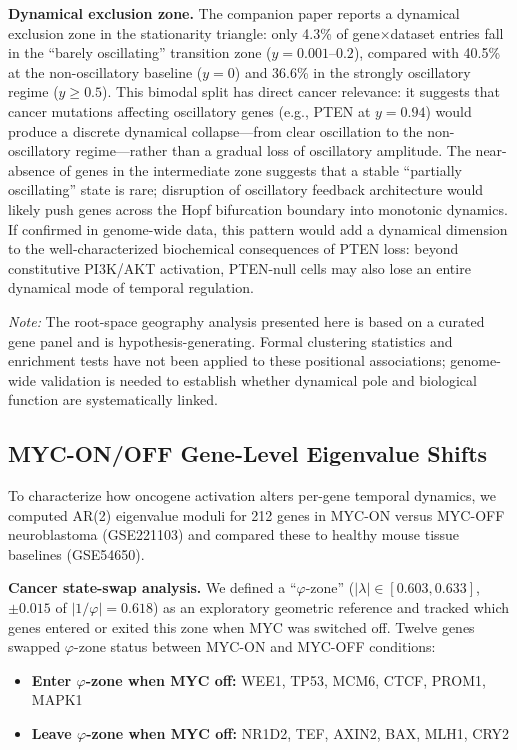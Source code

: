 \documentclass[11pt,letterpaper]{article}
\begin{document}
\textbf{Dynamical exclusion zone.} The companion paper \citep{whiteside2026paper1} reports a dynamical exclusion zone in the stationarity triangle: only 4.3\% of gene$\times$dataset entries fall in the ``barely oscillating'' transition zone ($y = 0.001$--$0.2$), compared with 40.5\% at the non-oscillatory baseline ($y = 0$) and 36.6\% in the strongly oscillatory regime ($y \geq 0.5$). This bimodal split has direct cancer relevance: it suggests that cancer mutations affecting oscillatory genes (e.g., PTEN at $y = 0.94$) would produce a discrete dynamical collapse---from clear oscillation to the non-oscillatory regime---rather than a gradual loss of oscillatory amplitude. The near-absence of genes in the intermediate zone suggests that a stable ``partially oscillating'' state is rare; disruption of oscillatory feedback architecture would likely push genes across the Hopf bifurcation boundary into monotonic dynamics. If confirmed in genome-wide data, this pattern would add a dynamical dimension to the well-characterized biochemical consequences of PTEN loss: beyond constitutive PI3K/AKT activation, PTEN-null cells may also lose an entire dynamical mode of temporal regulation.

\textit{Note:} The root-space geography analysis presented here is based on a curated gene panel and is hypothesis-generating. Formal clustering statistics and enrichment tests have not been applied to these positional associations; genome-wide validation is needed to establish whether dynamical pole and biological function are systematically linked.

\subsection{MYC-ON/OFF Gene-Level Eigenvalue Shifts}

To characterize how oncogene activation alters per-gene temporal dynamics, we computed AR(2) eigenvalue moduli for 212 genes in MYC-ON versus MYC-OFF neuroblastoma (GSE221103) and compared these to healthy mouse tissue baselines (GSE54650).

\textbf{Cancer state-swap analysis.} We defined a ``$\varphi$-zone'' ($|\lambda| \in [0.603, 0.633]$, $\pm 0.015$ of $|1/\varphi| = 0.618$) as an exploratory geometric reference and tracked which genes entered or exited this zone when MYC was switched off. Twelve genes swapped $\varphi$-zone status between MYC-ON and MYC-OFF conditions:

\begin{itemize}[noitemsep]
    \item \textbf{Enter $\varphi$-zone when MYC off:} WEE1, TP53, MCM6, CTCF, PROM1, MAPK1
    \item \textbf{Leave $\varphi$-zone when MYC off:} NR1D2, TEF, AXIN2, BAX, MLH1, CRY2
\end{itemize}
\end{document}
